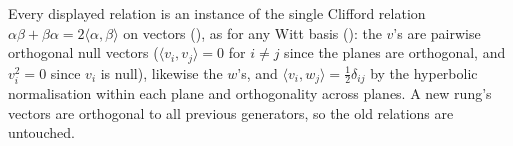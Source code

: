Every displayed relation is an instance of the single Clifford relation $\alpha\beta + \beta\alpha = 2\langle\alpha, \beta\rangle$ on vectors (), as for any Witt basis (): the $v$'s are pairwise orthogonal null vectors ($\langle v_i, v_j \rangle = 0$ for $i \neq j$ since the planes are orthogonal, and $v_i^2 = 0$ since $v_i$ is null), likewise the $w$'s, and $\langle v_i, w_j \rangle = \tfrac12\delta_{ij}$ by the hyperbolic normalisation within each plane and orthogonality across planes. A new rung's vectors are orthogonal to all previous generators, so the old relations are untouched.
